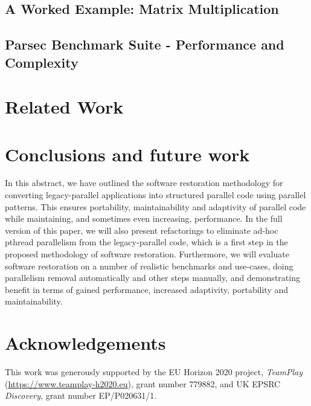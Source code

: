 \subsection{A Worked Example: Matrix Multiplication}

\subsection{Parsec Benchmark Suite - Performance and Complexity}

\section{Related Work}

\section{Conclusions and future work} \label{sec:Conclusions} 
In this abstract, we have outlined the software restoration methodology for converting legacy-parallel applications into structured parallel code using parallel patterns. This ensures portability, maintainability and adaptivity of parallel code while maintaining, and sometimes even increasing, performance. In the full version of this paper, we will also present refactorings to eliminate ad-hoc pthread parallelism from the legacy-parallel code, which is a first step in the proposed methodology of software restoration. Furthermore, we will evaluate software restoration on a number of realistic benchmarks and use-cases, doing parallelism removal automatically and other steps manually, and demonstrating benefit in terms of gained performance, increased adaptivity, portability and maintainability.

\appendix



\section*{Acknowledgements}
This work was generously supported by the EU Horizon 2020 project, \emph{TeamPlay} (\url{https://www.teamplay-h2020.eu}), grant number 779882, and UK EPSRC \emph{Discovery}, grant number EP/P020631/1.



